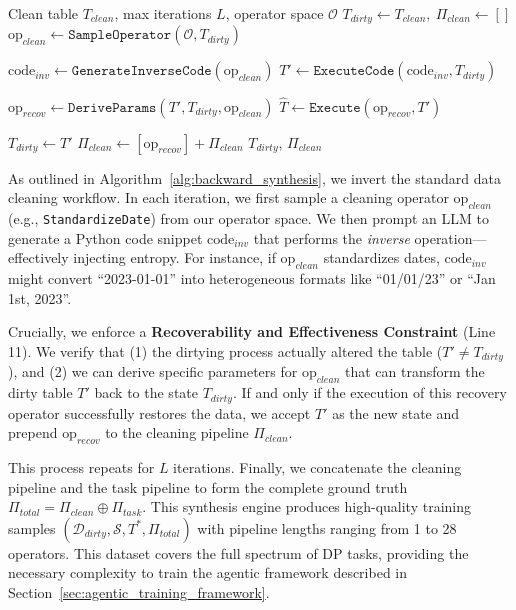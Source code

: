 \begin{algorithm}[!t]
\caption{\small Inverse Operator Injection Algorithm}
\label{alg:backward_synthesis}
\begin{algorithmic}[1]
    \Require \small Clean table $T_{clean}$, max iterations $L$, operator space $\mathcal{O}$
    \State $T_{dirty} \gets T_{clean},~\Pi_{clean} \gets []$
        \State {}
        \State $\text{op}_{clean} \gets \mathtt{SampleOperator}(\mathcal{O}, T_{dirty})$
        
        \State {}
        \State $\text{code}_{inv} \gets \mathtt{GenerateInverseCode}(\text{op}_{clean})$
        \State $T' \gets \mathtt{ExecuteCode}(\text{code}_{inv}, T_{dirty})$
        
        \State {}
        \State $\text{op}_{recov} \gets \mathtt{DeriveParams}(T', T_{dirty}, \text{op}_{clean})$
        \State $\hat{T} \gets \mathtt{Execute}(\text{op}_{recov}, T')$
        
            \State $T_{dirty} \gets T'$ 
            \State $\Pi_{clean} \gets [\text{op}_{recov}] + \Pi_{clean}$ 
        \EndIf
    \EndFor
    \State \Return $T_{dirty}$, $\Pi_{clean}$
\end{algorithmic}
\end{algorithm}

As outlined in Algorithm~\ref{alg:backward_synthesis}, we invert the standard data cleaning workflow. In each iteration, we first sample a cleaning operator $\text{op}_{clean}$ (e.g., \texttt{StandardizeDate}) from our operator space. We then prompt an LLM to generate a Python code snippet $\text{code}_{inv}$ that performs the \textit{inverse} operation—effectively injecting entropy. For instance, if $\text{op}_{clean}$ standardizes dates, $\text{code}_{inv}$ might convert ``2023-01-01'' into heterogeneous formats like ``01/01/23'' or ``Jan 1st, 2023''.

Crucially, we enforce a \textbf{Recoverability and Effectiveness Constraint} (Line 11). We verify that (1) the dirtying process actually altered the table ($T' \neq T_{dirty}$), and (2) we can derive specific parameters for $\text{op}_{clean}$ that can transform the dirty table $T'$ back to the state $T_{dirty}$. If and only if the execution of this recovery operator successfully restores the data, we accept $T'$ as the new state and prepend $\text{op}_{recov}$ to the cleaning pipeline $\Pi_{clean}$.

This process repeats for $L$ iterations. Finally, we concatenate the cleaning pipeline and the task pipeline to form the complete ground truth $\Pi_{total} = \Pi_{clean} \oplus \Pi_{task}$.
This synthesis engine produces high-quality training samples $(\mathcal{D}_{dirty}, \mathcal{S}, T^*, \Pi_{total})$ with pipeline lengths ranging from 1 to 28 operators. This dataset covers the full spectrum of DP tasks, providing the necessary complexity to train the agentic framework described in Section~\ref{sec:agentic_training_framework}.